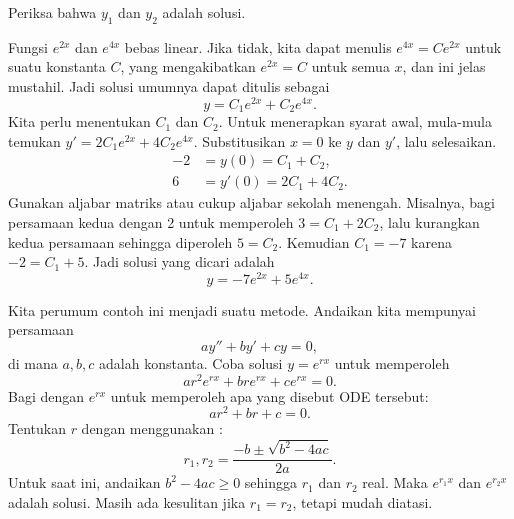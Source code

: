 \begin{exercise}
Periksa bahwa $y_1$ dan $y_2$ adalah solusi.
\end{exercise}

Fungsi $e^{2x}$ dan $e^{4x}$ bebas linear. Jika tidak, kita dapat menulis $e^{4x} = C e^{2x}$ untuk suatu konstanta $C$, yang mengakibatkan $e^{2x} = C$ untuk semua $x$, dan ini jelas mustahil. Jadi solusi umumnya dapat ditulis sebagai
\begin{equation*}
y = C_1 e^{2x} + C_2 e^{4x} .
\end{equation*}
Kita perlu menentukan $C_1$ dan $C_2$. Untuk menerapkan syarat awal, mula-mula temukan $y' = 2 C_1 e^{2x} + 4 C_2 e^{4x}$. Substitusikan $x=0$ ke $y$ dan $y'$, lalu selesaikan.
\begin{equation*}
\begin{aligned}
-2 & = y(0) = C_1 + C_2 , \\
6 & = y'(0) = 2 C_1 + 4 C_2 .
\end{aligned}
\end{equation*}
Gunakan aljabar matriks atau cukup aljabar sekolah menengah. Misalnya, bagi persamaan kedua dengan 2 untuk memperoleh $3 = C_1 + 2 C_2$, lalu kurangkan kedua persamaan sehingga diperoleh $5 = C_2$. Kemudian $C_1 = -7$ karena $-2 = C_1 + 5$. Jadi solusi yang dicari adalah
\begin{equation*}
y = -7 e^{2x} + 5 e^{4x} .
\end{equation*}

\medskip

Kita perumum contoh ini menjadi suatu metode. Andaikan kita mempunyai persamaan
\begin{equation} \label{ccsol:eq}
a y'' + b y' + c y = 0 ,
\end{equation}
di mana $a, b, c$ adalah konstanta. Coba solusi $y = e^{rx}$ untuk memperoleh
\begin{equation*}
a r^2 e^{rx} + b r e^{rx} + c e^{rx} = 0 .
\end{equation*}
Bagi dengan $e^{rx}$ untuk memperoleh apa yang disebut \emph{} ODE tersebut:
\begin{equation*}
a r^2 + b r + c = 0 .
\end{equation*}
Tentukan $r$ dengan menggunakan :
\begin{equation*}
r_1, r_2 = \frac{-b \pm \sqrt{b^2 - 4ac}}{2a} .
\end{equation*}
Untuk saat ini, andaikan $b^2 -4ac \geq 0$ sehingga $r_1$ dan $r_2$ real. Maka $e^{r_1 x}$ dan $e^{r_2 x}$ adalah solusi. Masih ada kesulitan jika $r_1 = r_2$, tetapi mudah diatasi.

